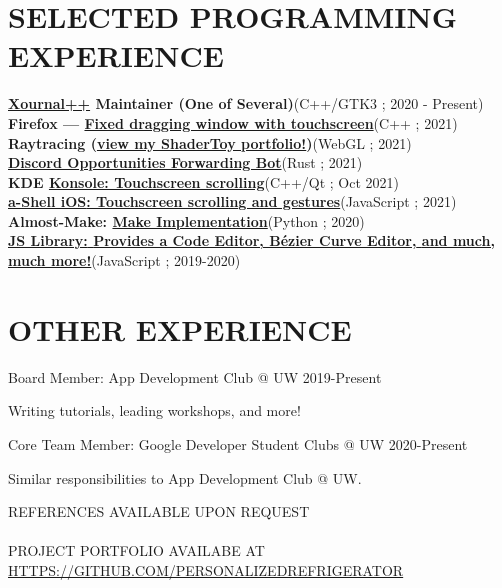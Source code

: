 \documentclass[12pt,letterpaper]{extarticle}
\begin{document}
  \section{SELECTED PROGRAMMING EXPERIENCE}
  \newcommand\prExpEntry[3]{\textbf{#1}\hfill (#2 ; #3) \\}
  \prExpEntry{\href{https://github.com/xournalpp/xournalpp}{Xournal++} Maintainer (One of Several)}{C++/GTK3}{2020 - Present}
  \prExpEntry{Firefox --- \href{https://phabricator.services.mozilla.com/D129349}{Fixed dragging window with touchscreen}}{C++}{2021}
  \prExpEntry{Raytracing (\href{https://shadertoy.com/user/personalizedrefrigerator}{view my ShaderToy portfolio!})}{WebGL}{2021}
  \prExpEntry{\href{https://github.com/UWAppDev/opportunities-forwarding-bot}{Discord Opportunities Forwarding Bot}}{Rust}{2021}
  \prExpEntry{KDE \href{https://invent.kde.org/utilities/konsole/-/merge_requests/516}{Konsole: Touchscreen scrolling}}{C++/Qt}{Oct 2021}
  \prExpEntry{\href{https://github.com/holzschu/a-shell/pull/246}{{a-Shell iOS}: Touchscreen scrolling and gestures}}{JavaScript}{2021}
  \prExpEntry{Almost-Make: \href{https://github.com/personalizedrefrigerator/AlmostMake}{Make Implementation}}{Python}{2020}
  \prExpEntry{\href{https://github.com/personalizedrefrigerator/LibJS}{{\footnotesize JS Library:} {\small Provides a Code Editor, Bézier Curve Editor,} {\tiny and much, much more!}}}{JavaScript}{2019-2020}

  \section{OTHER EXPERIENCE}
  Board Member: App Development Club @ UW \hfill 2019-Present
  \begin{addmargin}[2em]{2em}
    Writing tutorials, leading workshops, and more!
  \end{addmargin}
  Core Team Member: Google Developer Student Clubs @ UW \hfill 2020-Present
  \begin{addmargin}[2em]{2em}
    Similar responsibilities to App Development Club @ UW.
  \end{addmargin}

  \begin{center}
    REFERENCES AVAILABLE UPON REQUEST\\\phantom{;}\\
    PROJECT PORTFOLIO AVAILABE AT \url{HTTPS://GITHUB.COM/PERSONALIZEDREFRIGERATOR}
  \end{center}
\end{document}
